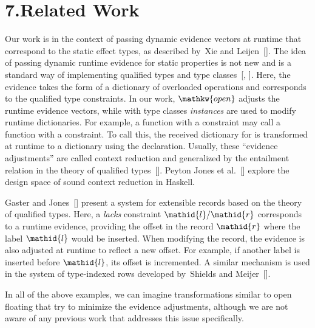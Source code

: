 \documentclass{llncs}
\begin{document}
\section{7.\hspace*{0.5em}Related Work}%

\noindent Our work is in the context of passing dynamic evidence vectors
at runtime that correspond to the static effect types, as described by~Xie and Leijen~[].
The idea of passing dynamic runtime evidence for static properties is not
new and is a standard way of implementing qualified types and
type classes~[, ]. Here, the evidence takes
the form of a dictionary of overloaded operations and corresponds to the
qualified type constraints. In our work, $\mathpre{\mathkw{open}}$ adjusts the runtime evidence
vectors, while with type classes \emph{instances} are used to modify runtime
dictionaries. For example, a function with a  constraint may
call a function with a  constraint. To call this, the received dictionary
for  is transformed at runtime to a  dictionary
using the  declaration. Usually,
these \textquotedblleft{}evidence adjustments\textquotedblright{} are called context reduction and generalized
by the entailment relation in the theory of qualified types~[].
Peyton Jones et al.~[] explore the design space of sound context reduction in Haskell.%

Gaster and Jones~[] present a system for extensible records based on
the theory of qualified types. Here, a \emph{lacks} constraint $\mathpre{\mathid{l}/\mathid{r}}$ corresponds
to a runtime evidence, providing the offset in the record $\mathpre{\mathid{r}}$ where
the label $\mathpre{\mathid{l}}$ would be inserted. When modifying the record, the evidence is also
adjusted at runtime to reflect a new offset. For example, if another label is
inserted before $\mathpre{\mathid{l}}$, its offset is incremented. A similar mechanism is used in
the system of type-indexed rows developed by~Shields and Meijer~[].%


In all of the above examples, we can imagine transformations similar to
open floating that try to minimize the evidence adjustments, although we are
not aware of any previous work that addresses this issue specifically.%
\end{document}
